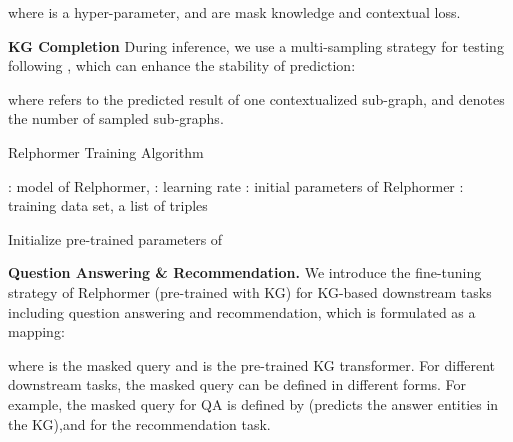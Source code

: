 \documentclass[sigconf]{acmart}
\begin{document}
where  is a hyper-parameter,  and  are mask knowledge and contextual loss.

\textbf{KG Completion}
During inference, we use a multi-sampling strategy for testing following \cite{Gophormer}, which can enhance the stability of prediction:



where  refers to the predicted result of one contextualized sub-graph, and  denotes the number of sampled  sub-graphs.















\begin{algorithm}[t]
  \caption{{Relphormer Training Algorithm}}
  \label{alg1} 


      \SetAlgoLined

      {  
          : model of Relphormer, : learning rate \;
          : initial parameters of Relphormer \;
: training data set, a list of triples\;
      }

      \BlankLine      
        { 
              Initialize pre-trained parameters of \;    
        }


  
\end{algorithm} 
\textbf{Question Answering \& Recommendation.}
We introduce the fine-tuning strategy of Relphormer (pre-trained with KG) for KG-based downstream tasks including question answering and recommendation, which is formulated as a mapping:



where  is the masked query and  is the pre-trained KG transformer.
For different downstream tasks, the masked query  can be defined in different forms.
For example, the masked query for QA is defined by  (predicts the answer entities in the KG),and   for the recommendation task.
\end{document}

